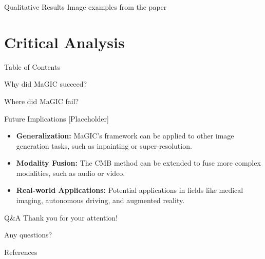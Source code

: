 \documentclass[pdf]{beamer}
\begin{document}
\begin{frame}{Qualitative Results}
    Image examples from the paper
\end{frame}

\section{Critical Analysis}
\begin{frame}{Table of Contents}
    \tableofcontents[currentsection]
\end{frame}
\begin{frame}{Why did MaGIC succeed?}
    
\end{frame}

\begin{frame}{Where did MaGIC fail?}

\end{frame}

\begin{frame}{Future Implications [Placeholder]}
    \begin{itemize}
        \item \textbf{Generalization:} MaGIC's framework can be applied to other image generation tasks, such as inpainting or super-resolution.
        \item \textbf{Modality Fusion:} The CMB method can be extended to fuse more complex modalities, such as audio or video.
        \item \textbf{Real-world Applications:} Potential applications in fields like medical imaging, autonomous driving, and augmented reality.
    \end{itemize}
\end{frame}

\begin{frame}{Q\&A}
    \centering
    \Huge{Thank you for your attention!}

    \vspace{0.5cm}

    \Large{Any questions?}
\end{frame}
\begin{frame}[allowframebreaks]{References}
    
\end{frame}
\end{document}
